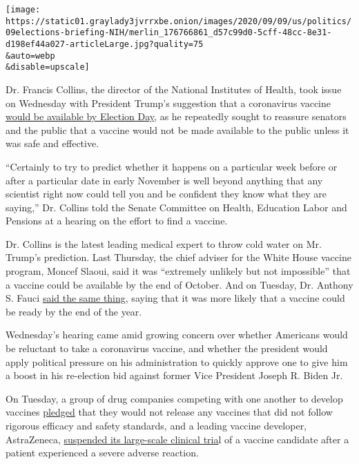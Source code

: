 \texttt{[image: https://static01.graylady3jvrrxbe.onion/images/2020/09/09/us/politics/09elections-briefing-NIH/merlin\_176766861\_d57c99d0-5cff-48cc-8e31-d198ef44a027-articleLarge.jpg?quality=75\\\&auto=webp\\\&disable=upscale]}

Dr. Francis Collins, the director of the National Institutes of Health,
took issue on Wednesday with President Trump's suggestion that a
coronavirus vaccine
\href{https://patch.com/us/white-house/trump-says-coronavirus-vaccine-could-be-ready-october}{would
be available by Election Day}, as he repeatedly sought to reassure
senators and the public that a vaccine would not be made available to
the public unless it was safe and effective.

``Certainly to try to predict whether it happens on a particular week
before or after a particular date in early November is well beyond
anything that any scientist right now could tell you and be confident
they know what they are saying,'' Dr. Collins told the Senate Committee
on Health, Education Labor and Pensions at a hearing on the effort to
find a vaccine.

Dr. Collins is the latest leading medical expert to throw cold water on
Mr. Trump's prediction. Last Thursday, the chief adviser for the White
House vaccine program, Moncef Slaoui, said it was ``extremely unlikely
but not impossible'' that a vaccine could be available by the end of
October. And on Tuesday, Dr. Anthony S. Fauci
\href{https://www.cnbc.com/2020/09/08/coronavirus-vaccine-dr-fauci-says-its-unlikely-it-will-be-ready-by-us-election.html}{said
the same thing}, saying that it was more likely that a vaccine could be
ready by the end of the year.

Wednesday's hearing came amid growing concern over whether Americans
would be reluctant to take a coronavirus vaccine, and whether the
president would apply political pressure on his administration to
quickly approve one to give him a boost in his re-election bid against
former Vice President Joseph R. Biden Jr.

On Tuesday, a group of drug companies competing with one another to
develop vaccines
\href{https://slack-redir.net/link?url=https\%3A\%2F\%2Fwww.nytimes3xbfgragh.onion\%2F2020\%2F09\%2F08\%2Fhealth\%2F9-drug-companies-pledge-coronavirus-vaccine.html}{pledged}
that they would not release any vaccines that did not follow rigorous
efficacy and safety standards, and a leading vaccine developer,
AstraZeneca,
\href{https://www.nytimes3xbfgragh.onion/2020/09/08/health/coronavirus-astrazeneca-vaccine-safety.html}{suspended
its large-scale clinical tria}l of a vaccine candidate after a patient
experienced a severe adverse reaction.

